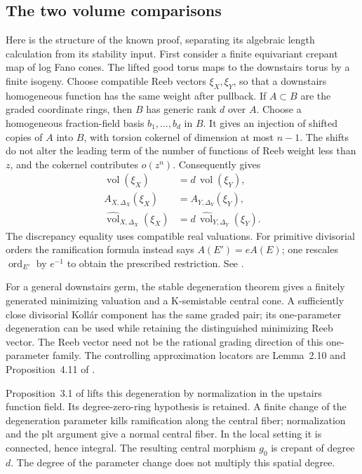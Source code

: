 \subsection{The two volume comparisons}
\label{sec:ytd-local-klt-finite-degree-proof}

Here is the structure of the known proof, separating its
algebraic length calculation from its stability input. First
consider a finite equivariant crepant map of log Fano cones.
The lifted good torus maps to the downstairs torus by a finite
isogeny. Choose compatible Reeb vectors $\xi_X,\xi_Y$, so
that a downstairs homogeneous function has the same weight
after pullback. If $A\subset B$ are the graded coordinate
rings, then $B$ has generic rank $d$ over $A$. Choose a
homogeneous fraction-field basis $b_1,\ldots,b_d$ in $B$.
It gives an injection of shifted copies of $A$ into $B$,
with torsion cokernel of dimension at most $n-1$. The shifts
do not alter the leading term of the number of functions of
Reeb weight less than $z$, and the cokernel contributes
$o(z^n)$. Consequently
\cite[Lemma~5.1]{Liu26FiniteDegreeV2} gives
\[
\tag{68.23bf}\label{eq:ytd-local-klt-cone-degree}
\begin{aligned}
 \operatorname{vol}(\xi_X)&=d\,\operatorname{vol}(\xi_Y),\\
 A_{X,\Delta_X}(\xi_X)&=A_{Y,\Delta_Y}(\xi_Y),\\
 \widehat{\operatorname{vol}}_{X,\Delta_X}(\xi_X)
       &=d\,\widehat{\operatorname{vol}}_{Y,\Delta_Y}(\xi_Y).
\end{aligned}
\]
The discrepancy equality uses compatible real valuations.
For primitive divisorial orders the ramification formula instead
says $A(E')=eA(E)$; one rescales $\operatorname{ord}_{E'}$
by $e^{-1}$ to obtain the prescribed restriction. See
\cite[Proposition~2.14]{DorschLazic15FiniteDiscrepancyPublished}.

For a general downstairs germ, the stable degeneration theorem
\cite[Theorems~1.1--1.2]{XuZhuang25StableDegV2} gives a
finitely generated minimizing valuation and a K-semistable
central cone. A sufficiently close divisorial Koll\'ar component
has the same graded pair; its one-parameter degeneration can
be used while retaining the distinguished minimizing Reeb
vector. The Reeb vector need not be the rational grading
direction of this one-parameter family. The controlling
approximation locators are Lemma~2.10 and Proposition~4.11
of \cite{LiXu19HigherRankV2}.

Proposition~3.1 of \cite{Liu26FiniteDegreeV2} lifts this
degeneration by normalization in the upstairs function field.
Its degree-zero-ring hypothesis is retained. A finite change
of the degeneration parameter kills ramification along the
central fiber; normalization and the plt argument give a
normal central fiber. In the local setting it is connected,
hence integral. The resulting central morphism $g_0$ is
crepant of degree $d$. The degree of the parameter change
does not multiply this spatial degree.

